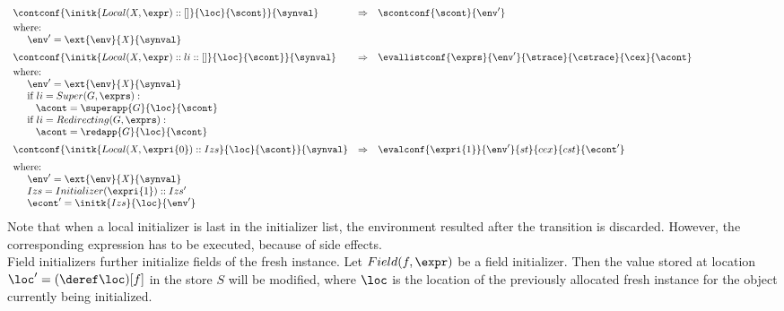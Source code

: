 \documentclass{article}
\begin{document}
\[
  \begin{array}{lcl@{\hspace{30mm}}}
	\contconf{\initk{Local(\variablemeta, \expr) :: []}{\loc}{\scont}}{\synval}
	& \Rightarrow &
	\scontconf{\scont}{\env'}\\[1mm]
	\textrm{where:}\\
	\hspace{5mm}\env' = \ext{\env}{\variablemeta}{\synval}\\[2mm]

	\contconf{\initk{Local(\variablemeta, \expr) :: li :: []}{\loc}{\scont}}{\synval}
	& \Rightarrow &
	\evallistconf{\exprs}{\env'}{\strace}{\cstrace}{\cex}{\acont}\\[1mm]
	\textrm{where:}\\
	\hspace{5mm}\env' = \ext{\env}{\variablemeta}{\synval}\\
	\hspace{5mm}\textrm{if } li = Super(G, \exprs):\\
	\hspace{8mm}\acont = \superapp{G}{\loc}{\scont}\\
	\hspace{5mm}\textrm{if } li = Redirecting(G, \exprs):\\
	\hspace{8mm}\acont = \redapp{G}{\loc}{\scont}\\[2mm]

	\contconf{\initk{Local(\variablemeta, \expri{0}) :: Izs}{\loc}{\scont}}{\synval}
	& \Rightarrow &
	\evalconf{\expri{1}}{\env'}{st}{cex}{cst}{\econt'}\\[2mm]
	\textrm{where:}\\
	\hspace{5mm}\env' = \ext{\env}{\variablemeta}{\synval}\\
	\hspace{5mm}Izs = Initializer(\expri{1}) :: Izs'\\
	\hspace{5mm}\econt' = \initk{Izs}{\loc}{\env'}
  \end{array}
\]
\noindent
Note that when a local initializer is last in the initializer list, the environment resulted after the transition is discarded. However, the corresponding expression has to be executed, because of side effects.
\\[2mm]
\noindent
Field initializers further initialize fields of the fresh instance. Let $Field(f, \expr)$ be a field initializer. Then the value stored at location $\loc' = (\deref\loc)[f]$ in the store $S$ will be modified, where $\loc$ is the location of the previously allocated fresh instance for the object currently being initialized.
\end{document}
